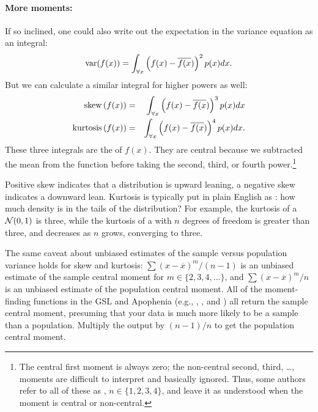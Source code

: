 \paragraph{More moments:}   
If so inclined, one could also write out the
expectation in the variance equation as an integral:
$$\operatorname{var}(f(x))=\int_{\forall x} \left(f(x) - \overline{f(x})\right)^2 p(x) dx.$$
But we can calculate a similar integral for higher powers as well:
\begin{eqnarray*}
{\rm skew}\left(f(x)\right)&=&\int_{\forall x} \left(f(x) - \overline{f(x})\right)^3 p(x) dx\\
{\rm kurtosis}\left(f(x)\right)&=&\int_{\forall x} \left(f(x) - \overline{f(x})\right)^4 p(x) dx.
\end{eqnarray*}
These three integrals are the  of $f(x)$. They
are central because we subtracted the mean from the function before
taking the second, third, or fourth power.\footnote{The
central first moment is always zero; the non-central second, third,
\dots, moments are difficult to interpret and basically ignored. Thus,
some authors refer to all of these as , $n \in
\{1, 2, 3, 4\}$, and leave
it as understood when the moment is central or non-central.}

Positive skew indicates that a distribution is upward leaning, a negative
skew indicates a downward lean. Kurtosis is typically put in plain
English as : how much density is in the tails of the
distribution? For example, the kurtosis of a ${\cal N}(0,1)$ is three,
while the kurtosis of a  with $n$ degrees of
freedom is greater than three, and decreases as $n$ grows, converging to
three. 

 
 
\label{kurtskew}
The same caveat about unbiased estimates of the sample versus population
variance holds for skew and kurtosis: $\sum (x-\overline x)^m/(n-1)$
is an unbiased estimate of the sample central moment for $m \in\{2, 3,
4, \dots\}$, and $\sum (x-\overline x)^m/n$ is an unbiased estimate of
the population central moment. All of the moment-finding functions in
the GSL and Apophenia (e.g.,
,
, and
) all return the sample central
moment, presuming that your data is much more likely to be a sample than
a population. Multiply the output by $(n-1)/n$ to get the population
central moment.

